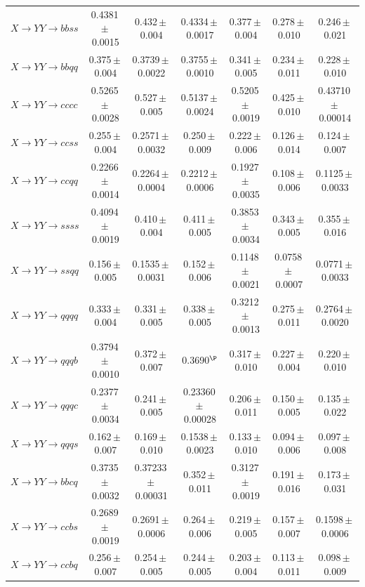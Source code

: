 \begin{landscape}
{\begin{longtable}{@{\extracolsep{\fill}}lcccccc@{}}
$X\to YY\to bbss$ & 0.4381\,$\pm$\,0.0015 & 0.432\,$\pm$\,0.004 & 0.4334\,$\pm$\,0.0017 & 0.377\,$\pm$\,0.004 & 0.278\,$\pm$\,0.010 & 0.246\,$\pm$\,0.021 \\
$X\to YY\to bbqq$ & 0.375\,$\pm$\,0.004 & 0.3739\,$\pm$\,0.0022 & 0.3755\,$\pm$\,0.0010 & 0.341\,$\pm$\,0.005 & 0.234\,$\pm$\,0.011 & 0.228\,$\pm$\,0.010 \\
$X\to YY\to cccc$ & 0.5265\,$\pm$\,0.0028 & 0.527\,$\pm$\,0.005 & 0.5137\,$\pm$\,0.0024 & 0.5205\,$\pm$\,0.0019 & 0.425\,$\pm$\,0.010 & 0.43710\,$\pm$\,0.00014 \\
$X\to YY\to ccss$ & 0.255\,$\pm$\,0.004 & 0.2571\,$\pm$\,0.0032 & 0.250\,$\pm$\,0.009 & 0.222\,$\pm$\,0.006 & 0.126\,$\pm$\,0.014 & 0.124\,$\pm$\,0.007 \\
$X\to YY\to ccqq$ & 0.2266\,$\pm$\,0.0014 & 0.2264\,$\pm$\,0.0004 & 0.2212\,$\pm$\,0.0006 & 0.1927\,$\pm$\,0.0035 & 0.108\,$\pm$\,0.006 & 0.1125\,$\pm$\,0.0033 \\
$X\to YY\to ssss$ & 0.4094\,$\pm$\,0.0019 & 0.410\,$\pm$\,0.004 & 0.411\,$\pm$\,0.005 & 0.3853\,$\pm$\,0.0034 & 0.343\,$\pm$\,0.005 & 0.355\,$\pm$\,0.016 \\
$X\to YY\to ssqq$ & 0.156\,$\pm$\,0.005 & 0.1535\,$\pm$\,0.0031 & 0.152\,$\pm$\,0.006 & 0.1148\,$\pm$\,0.0021 & 0.0758\,$\pm$\,0.0007 & 0.0771\,$\pm$\,0.0033 \\
$X\to YY\to qqqq$ & 0.333\,$\pm$\,0.004 & 0.331\,$\pm$\,0.005 & 0.338\,$\pm$\,0.005 & 0.3212\,$\pm$\,0.0013 & 0.275\,$\pm$\,0.011 & 0.2764\,$\pm$\,0.0020 \\
$X\to YY\to qqqb$ & 0.3794\,$\pm$\,0.0010 & 0.372\,$\pm$\,0.007 & 0.3690$^{\P}$ & 0.317\,$\pm$\,0.010 & 0.227\,$\pm$\,0.004 & 0.220\,$\pm$\,0.010 \\
$X\to YY\to qqqc$ & 0.2377\,$\pm$\,0.0034 & 0.241\,$\pm$\,0.005 & 0.23360\,$\pm$\,0.00028 & 0.206\,$\pm$\,0.011 & 0.150\,$\pm$\,0.005 & 0.135\,$\pm$\,0.022 \\
$X\to YY\to qqqs$ & 0.162\,$\pm$\,0.007 & 0.169\,$\pm$\,0.010 & 0.1538\,$\pm$\,0.0023 & 0.133\,$\pm$\,0.010 & 0.094\,$\pm$\,0.006 & 0.097\,$\pm$\,0.008 \\
$X\to YY\to bbcq$ & 0.3735\,$\pm$\,0.0032 & 0.37233\,$\pm$\,0.00031 & 0.352\,$\pm$\,0.011 & 0.3127\,$\pm$\,0.0019 & 0.191\,$\pm$\,0.016 & 0.173\,$\pm$\,0.031 \\
$X\to YY\to ccbs$ & 0.2689\,$\pm$\,0.0019 & 0.2691\,$\pm$\,0.0006 & 0.264\,$\pm$\,0.006 & 0.219\,$\pm$\,0.005 & 0.157\,$\pm$\,0.007 & 0.1598\,$\pm$\,0.0006 \\
$X\to YY\to ccbq$ & 0.256\,$\pm$\,0.007 & 0.254\,$\pm$\,0.005 & 0.244\,$\pm$\,0.005 & 0.203\,$\pm$\,0.004 & 0.113\,$\pm$\,0.011 & 0.098\,$\pm$\,0.009 \\

\end{longtable}}
\end{landscape}
